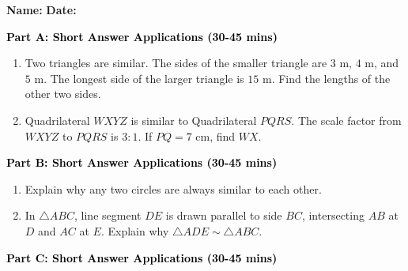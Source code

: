 \documentclass[12pt, letterpaper, fleqn]{article}
\begin{document}
\textbf{Name:} \underline{\hspace{5cm}}
\hfill
\textbf{Date:} \underline{\hspace{3cm}}\\


\begin{tcolorbox}[colback=customteal!20]
\large\textcolor{black}{\textbf{Part A: Short Answer Applications (30-45 mins)}}
\end{tcolorbox}

\vspace{3mm}

\begin{enumerate}[itemsep=4.2cm, leftmargin=0.6cm]
\item Two triangles are similar. The sides of the smaller triangle are $3\text{ m}$, $4\text{ m}$, and $5\text{ m}$. The longest side of the larger triangle is $15\text{ m}$. Find the lengths of the other two sides.
\item Quadrilateral $WXYZ$ is similar to Quadrilateral $PQRS$. The scale factor from $WXYZ$ to $PQRS$ is $3:1$. If $PQ = 7\text{ cm}$, find $WX$.
\end{enumerate}

\newpage

\begin{tcolorbox}[colback=customteal!20]
\large\textcolor{black}{\textbf{Part B: Short Answer Applications (30-45 mins)}}
\end{tcolorbox}

\vspace{3mm}

\begin{enumerate}[itemsep=4.2cm, leftmargin=0.6cm, resume]
\item Explain why any two circles are always similar to each other.
\item In $\triangle ABC$, line segment $DE$ is drawn parallel to side $BC$, intersecting $AB$ at $D$ and $AC$ at $E$. Explain why $\triangle ADE \sim \triangle ABC$.
\end{enumerate}

\newpage

\begin{tcolorbox}[colback=customteal!20]
\large\textcolor{black}{\textbf{Part C: Short Answer Applications (30-45 mins)}}
\end{tcolorbox}

\vspace{3mm}
\end{document}
